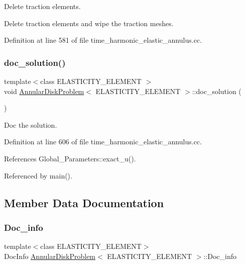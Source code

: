Delete traction elements. 

Delete traction elements and wipe the traction meshes. 

Definition at line 581 of file time\+\_\+harmonic\+\_\+elastic\+\_\+annulus.\+cc.

\mbox{\label{classAnnularDiskProblem_a8034c630f21ccf5882a21eef2c1464fc}} 
\subsubsection{\texorpdfstring{doc\+\_\+solution()}{doc\_solution()}}
{\footnotesize\ttfamily template$<$class E\+L\+A\+S\+T\+I\+C\+I\+T\+Y\+\_\+\+E\+L\+E\+M\+E\+NT $>$ \\
void \hyperlink{classAnnularDiskProblem}{Annular\+Disk\+Problem}$<$ E\+L\+A\+S\+T\+I\+C\+I\+T\+Y\+\_\+\+E\+L\+E\+M\+E\+NT $>$\+::doc\+\_\+solution (\begin{DoxyParamCaption}{ }\end{DoxyParamCaption})}



Doc the solution. 



Definition at line 606 of file time\+\_\+harmonic\+\_\+elastic\+\_\+annulus.\+cc.



References Global\+\_\+\+Parameters\+::exact\+\_\+u().



Referenced by main().



\subsection{Member Data Documentation}
\mbox{\label{classAnnularDiskProblem_aabdb5b1d506e3f758629c87395d0747d}} 
\subsubsection{\texorpdfstring{Doc\+\_\+info}{Doc\_info}}
{\footnotesize\ttfamily template$<$class E\+L\+A\+S\+T\+I\+C\+I\+T\+Y\+\_\+\+E\+L\+E\+M\+E\+NT$>$ \\
Doc\+Info \hyperlink{classAnnularDiskProblem}{Annular\+Disk\+Problem}$<$ E\+L\+A\+S\+T\+I\+C\+I\+T\+Y\+\_\+\+E\+L\+E\+M\+E\+NT $>$\+::Doc\+\_\+info\hspace{0.3cm}{\ttfamily [private]}}



